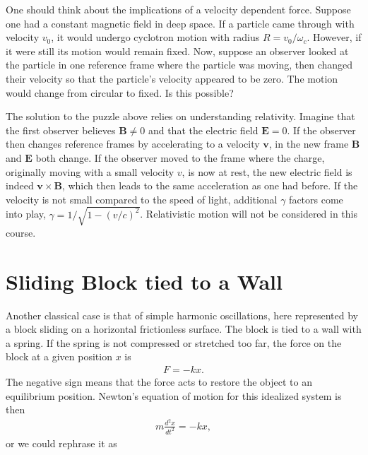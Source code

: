 \documentclass[letterpaper,10pt,english]{sphinxmanual}
\begin{document}
One should think about the implications of a velocity dependent
force. Suppose one had a constant magnetic field in deep space. If a
particle came through with velocity \(v_0\), it would undergo cyclotron
motion with radius \(R=v_0/\omega_c\). However, if it were still its
motion would remain fixed. Now, suppose an observer looked at the
particle in one reference frame where the particle was moving, then
changed their velocity so that the particle’s velocity appeared to be
zero. The motion would change from circular to fixed. Is this
possible?

The solution to the puzzle above relies on understanding
relativity. Imagine that the first observer believes \(\boldsymbol{B}\ne 0\) and
that the electric field \(\boldsymbol{E}=0\). If the observer then changes
reference frames by accelerating to a velocity \(\boldsymbol{v}\), in the new
frame \(\boldsymbol{B}\) and \(\boldsymbol{E}\) both change. If the observer moved to the
frame where the charge, originally moving with a small velocity \(v\),
is now at rest, the new electric field is indeed \(\boldsymbol{v}\times\boldsymbol{B}\),
which then leads to the same acceleration as one had before. If the
velocity is not small compared to the speed of light, additional
\(\gamma\) factors come into play,
\(\gamma=1/\sqrt{1-(v/c)^2}\). Relativistic motion will not be
considered in this course.


\section{Sliding Block tied to a Wall}
\label{\detokenize{chapter1:sliding-block-tied-to-a-wall}}
Another classical case is that of simple harmonic oscillations, here represented by a block sliding on a horizontal frictionless surface. The block is tied to a wall with a spring. If the spring is not compressed or stretched too far, the force on the block at a given position \(x\) is
\begin{equation*}
\begin{split}
F=-kx.
\end{split}
\end{equation*}
The negative sign means that the force acts to restore the object to an equilibrium position. Newton’s equation of motion for this idealized system is then
\begin{equation*}
\begin{split}
m\frac{d^2x}{dt^2}=-kx,
\end{split}
\end{equation*}
or we could rephrase it as
\end{document}
